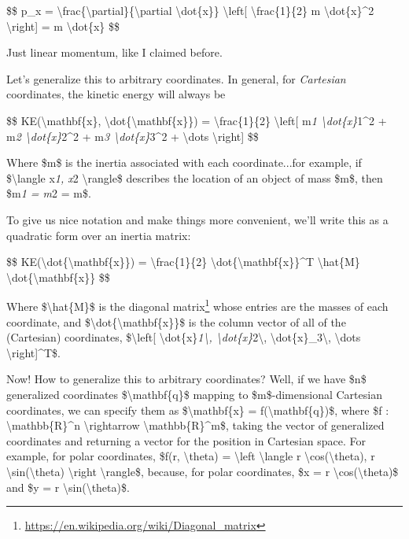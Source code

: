 \documentclass[]{article}
\renewcommand{\href}[2]{#2\footnote{\url{#1}}}
\begin{document}
\$\$ p\_x =
\textbackslash{}frac\{\textbackslash{}partial\}\{\textbackslash{}partial
\textbackslash{}dot\{x\}\} \textbackslash{}left{[}
\textbackslash{}frac\{1\}\{2\} m \textbackslash{}dot\{x\}\^{}2
\textbackslash{}right{]} = m \textbackslash{}dot\{x\} \$\$

Just linear momentum, like I claimed before.

Let's generalize this to arbitrary coordinates. In general, for \emph{Cartesian}
coordinates, the kinetic energy will always be

\$\$ KE(\textbackslash{}mathbf\{x\},
\textbackslash{}dot\{\textbackslash{}mathbf\{x\}\}) =
\textbackslash{}frac\{1\}\{2\} \textbackslash{}left{[} m\emph{1
\textbackslash{}dot\{x\}}1\^{}2 + m\emph{2 \textbackslash{}dot\{x\}}2\^{}2 +
m\emph{3 \textbackslash{}dot\{x\}}3\^{}2 + \textbackslash{}dots
\textbackslash{}right{]} \$\$

Where \$m\$ is the inertia associated with each coordinate...for example, if
\$\textbackslash{}langle x\emph{1, x}2 \textbackslash{}rangle\$ describes the
location of an object of mass \$m\$, then \$m\emph{1 = m}2 = m\$.

To give us nice notation and make things more convenient, we'll write this as a
quadratic form over an inertia matrix:

\$\$ KE(\textbackslash{}dot\{\textbackslash{}mathbf\{x\}\}) =
\textbackslash{}frac\{1\}\{2\}
\textbackslash{}dot\{\textbackslash{}mathbf\{x\}\}\^{}T \textbackslash{}hat\{M\}
\textbackslash{}dot\{\textbackslash{}mathbf\{x\}\} \$\$

Where \$\textbackslash{}hat\{M\}\$ is the
\href{https://en.wikipedia.org/wiki/Diagonal_matrix}{diagonal matrix} whose
entries are the masses of each coordinate, and
\$\textbackslash{}dot\{\textbackslash{}mathbf\{x\}\}\$ is the column vector of
all of the (Cartesian) coordinates, \$\textbackslash{}left{[}
\textbackslash{}dot\{x\}\emph{1\textbackslash{},
\textbackslash{}dot\{x\}}2\textbackslash{},
\textbackslash{}dot\{x\}\_3\textbackslash{}, \textbackslash{}dots
\textbackslash{}right{]}\^{}T\$.

Now! How to generalize this to arbitrary coordinates? Well, if we have \$n\$
generalized coordinates \$\textbackslash{}mathbf\{q\}\$ mapping to
\$m\$-dimensional Cartesian coordinates, we can specify them as
\$\textbackslash{}mathbf\{x\} = f(\textbackslash{}mathbf\{q\})\$, where \$f :
\textbackslash{}mathbb\{R\}\^{}n \textbackslash{}rightarrow
\textbackslash{}mathbb\{R\}\^{}m\$, taking the vector of generalized coordinates
and returning a vector for the position in Cartesian space. For example, for
polar coordinates, \$f(r, \textbackslash{}theta) = \textbackslash{}left
\textbackslash{}langle r \textbackslash{}cos(\textbackslash{}theta), r
\textbackslash{}sin(\textbackslash{}theta) \textbackslash{}right
\textbackslash{}rangle\$, because, for polar coordinates, \$x = r
\textbackslash{}cos(\textbackslash{}theta)\$ and \$y = r
\textbackslash{}sin(\textbackslash{}theta)\$.
\end{document}
